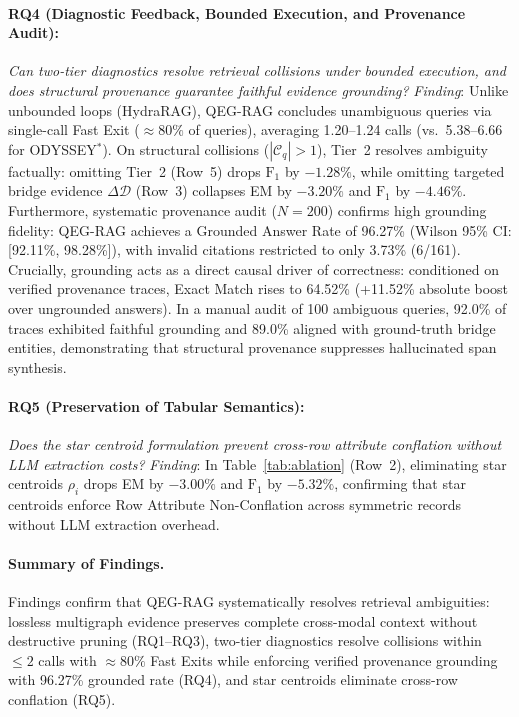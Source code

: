 \documentclass[runningheads]{llncs}
\begin{document}
\paragraph{RQ4 (Diagnostic Feedback, Bounded Execution, and Provenance Audit):}
\emph{Can two-tier diagnostics resolve retrieval collisions under bounded execution, and does structural provenance guarantee faithful evidence grounding?} \emph{Finding}: Unlike unbounded loops (HydraRAG), QEG-RAG concludes unambiguous queries via single-call Fast Exit ($\approx 80\%$ of queries), averaging 1.20--1.24 calls (vs.\ 5.38--6.66 for ODYSSEY$^*$). On structural collisions ($|\mathcal{C}_q| > 1$), Tier~2 resolves ambiguity factually: omitting Tier~2 (Row~5) drops $\text{F}_1$ by $-1.28\%$, while omitting targeted bridge evidence $\Delta\mathcal{D}$ (Row~3) collapses EM by $-3.20\%$ and $\text{F}_1$ by $-4.46\%$. Furthermore, systematic provenance audit ($N=200$) confirms high grounding fidelity: QEG-RAG achieves a Grounded Answer Rate of 96.27\% (Wilson 95\% CI: [92.11\%, 98.28\%]), with invalid citations restricted to only 3.73\% (6/161). Crucially, grounding acts as a direct causal driver of correctness: conditioned on verified provenance traces, Exact Match rises to 64.52\% (+11.52\% absolute boost over ungrounded answers). In a manual audit of 100 ambiguous queries, 92.0\% of traces exhibited faithful grounding and 89.0\% aligned with ground-truth bridge entities, demonstrating that structural provenance suppresses hallucinated span synthesis.

\paragraph{RQ5 (Preservation of Tabular Semantics):}
\emph{Does the star centroid formulation prevent cross-row attribute conflation without LLM extraction costs?} \emph{Finding}: In Table~\ref{tab:ablation} (Row~2), eliminating star centroids $\rho_i$ drops EM by $-3.00\%$ and $\text{F}_1$ by $-5.32\%$, confirming that star centroids enforce Row Attribute Non-Conflation across symmetric records without LLM extraction overhead.

\paragraph{Summary of Findings.}
Findings confirm that QEG-RAG systematically resolves retrieval ambiguities: lossless multigraph evidence preserves complete cross-modal context without destructive pruning (RQ1--RQ3), two-tier diagnostics resolve collisions within $\le 2$ calls with $\approx 80\%$ Fast Exits while enforcing verified provenance grounding with 96.27\% grounded rate (RQ4), and star centroids eliminate cross-row conflation (RQ5).
\end{document}
